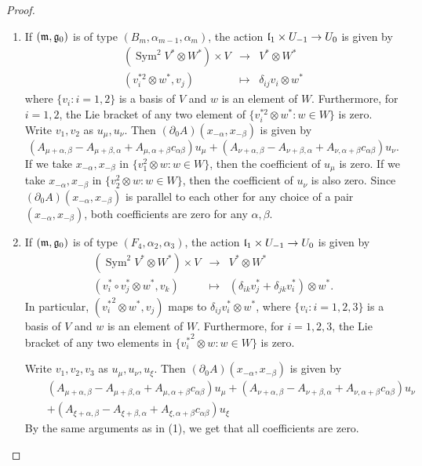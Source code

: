 \documentclass[12pt]{amsart}
\theoremstyle{plain}
\theoremstyle{definition}
\def\Sym{\operatorname{Sym}}
\begin{document}
\begin{proof}
 \begin{enumerate}
 \item If $(\frak m, \frak g_0)$ is of type $(B_m, \alpha_{m-1}, \alpha_m)$, the action $ \frak l_1 \times U_{-1} \rightarrow U_0$ is given by
 \begin{eqnarray*}
%
 (\Sym ^2 V^* \otimes W^*) \times  V  &\rightarrow&  V^* \otimes W^* \\
%
(v_i^{*2} \otimes w^*, v_j) &\mapsto& \delta_{ij}v_i \otimes w^*
 \end{eqnarray*}
where $\{v_i : i=1,2\}$ is a basis of $V$ and $w$ is an element of $W$. Furthermore,  for $i=1,2$, the Lie bracket of any two element of $\{v_i^{*2} \otimes w^*: w \in W\}$ is zero. Write $v_1, v_2$ as $u_{\mu}, u_{\nu}$. Then
  $(\partial_0A)(x_{-\alpha}, x_{-\beta})$ is given by  $$\left( A_{\mu+ \alpha, \beta} - A_{\mu+\beta, \alpha} + A_{\mu, \alpha+\beta} c_{\alpha \beta}  \right) u_{\mu} + \left( A_{\nu+ \alpha, \beta} - A_{\nu+\beta, \alpha} + A_{\nu, \alpha+\beta} c_{\alpha \beta}  \right) u_{\nu}. $$
 If we take $x_{-\alpha}, x_{-\beta}$ in $\{v_1^2 \otimes w : w \in W\}$, then the coefficient of $u_{\mu}$ is zero. If we take $x_{-\alpha}, x_{-\beta}$ in $\{v_2^2 \otimes w : w \in W\}$, then the coefficient of $u_{\nu}$ is also zero.
 Since  $(\partial_0A)(x_{-\alpha}, x_{-\beta})$ is parallel to each other for any choice of a pair $(x_{-\alpha},x_{-\beta})$, both coefficients are zero for any $\alpha, \beta$. \\

 \item If $(\frak m, \frak g_0)$ is of type $(F_4, \alpha_2, \alpha_3)$, the action $ \frak l_1 \times U_{-1} \rightarrow U_0$ is given by
 \begin{eqnarray*}
 (\Sym^2 V^* \otimes W^*) \times  V &\rightarrow& V^* \otimes W^*\\
 ( {v_i^*}\circ{v_j^*} \otimes w^* , v_k ) &\mapsto & (\delta_{ik}v_j^* + \delta_{jk}v_i^*) \otimes w^*.
  \end{eqnarray*}
In particular, $({v_i^*}^2 \otimes w^*, v_j )$ maps to $\delta_{ij}v_i^* \otimes w^*$, where $\{v_i : i=1,2,3\}$ is a basis of $V$ and $w$ is an element of $W$.  Furthermore, for  $i=1,2,3$,  the Lie bracket of any two elements in $\{ {v_i^*}^2 \otimes w: w \in W\}$ is zero.

Write $v_1, v_2,v_3$ as $u_{\mu}, u_{\nu}, u_{\xi}$. Then
  $(\partial_0A)(x_{-\alpha}, x_{-\beta})$ is given by
  \begin{eqnarray*}
 && \left( A_{\mu+ \alpha, \beta} - A_{\mu+\beta, \alpha} + A_{\mu, \alpha+\beta} c_{\alpha \beta}  \right) u_{\mu} + \left( A_{\nu+ \alpha, \beta} - A_{\nu+\beta, \alpha} + A_{\nu, \alpha+\beta} c_{\alpha \beta}  \right) u_{\nu} \\
 && + \left( A_{\xi+ \alpha, \beta} - A_{\xi+\beta, \alpha} + A_{\xi, \alpha+\beta} c_{\alpha \beta}  \right) u_{\xi}
 \end{eqnarray*}
 By the same arguments as in (1), we get that all coefficients are zero. 
 \end{enumerate}
\end{proof}
\end{document}
